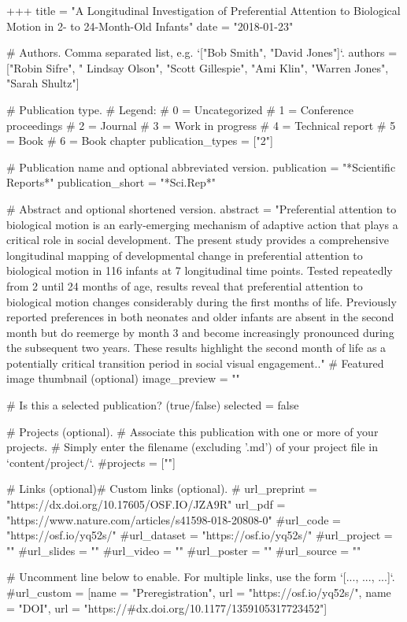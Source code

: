 +++
title = "A Longitudinal Investigation of Preferential Attention to Biological Motion in 2- to 24-Month-Old Infants"
date = "2018-01-23"

# Authors. Comma separated list, e.g. `["Bob Smith", "David Jones"]`.
authors = ["Robin Sifre", " Lindsay Olson", "Scott Gillespie", "Ami Klin", "Warren Jones", "Sarah Shultz"]

# Publication type.
# Legend:
# 0 = Uncategorized
# 1 = Conference proceedings
# 2 = Journal
# 3 = Work in progress
# 4 = Technical report
# 5 = Book
# 6 = Book chapter
publication_types = ["2"]

# Publication name and optional abbreviated version.
publication = "*Scientific Reports*"
publication_short = "*Sci.Rep*"

# Abstract and optional shortened version.
abstract = "Preferential attention to biological motion is an early-emerging mechanism of adaptive action that plays a critical role in social development. The present study provides a comprehensive longitudinal mapping of developmental change in preferential attention to biological motion in 116 infants at 7 longitudinal time points. Tested repeatedly from 2 until 24 months of age, results reveal that preferential attention to biological motion changes considerably during the first months of life. Previously reported preferences in both neonates and older infants are absent in the second month but do reemerge by month 3 and become increasingly pronounced during the subsequent two years. These results highlight the second month of life as a potentially critical transition period in social visual engagement.."
# Featured image thumbnail (optional)
image_preview = ""

# Is this a selected publication? (true/false)
selected = false

# Projects (optional).
#   Associate this publication with one or more of your projects.
#   Simply enter the filename (excluding '.md') of your project file in `content/project/`.
#projects = [""]

# Links (optional)# Custom links (optional).
# url_preprint = "https://dx.doi.org/10.17605/OSF.IO/JZA9R"
url_pdf = "https://www.nature.com/articles/s41598-018-20808-0"
#url_code = "https://osf.io/yq52s/"
#url_dataset = "https://osf.io/yq52s/"
#url_project = ""
#url_slides = ""
#url_video = ""
#url_poster = ""
#url_source = ""


#   Uncomment line below to enable. For multiple links, use the form `[{...}, {...}, {...}]`.
#url_custom = [{name = "Preregistration", url = "https://osf.io/yq52s/"}, {name = "DOI", url = "https://#dx.doi.org/10.1177/1359105317723452"}]


